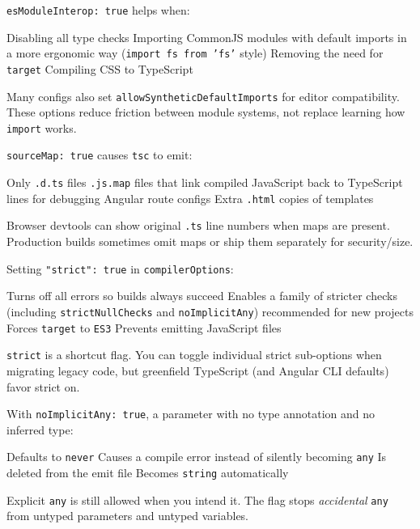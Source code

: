 \question[4]
\texttt{esModuleInterop: true} helps when:
\begin{choices}
  \choice Disabling all type checks
  \CorrectChoice Importing CommonJS modules with default imports in a more ergonomic way (\texttt{import fs from 'fs'} style)
  \choice Removing the need for \texttt{target}
  \choice Compiling CSS to TypeScript
\end{choices}
\begin{solution}
  Many configs also set \texttt{allowSyntheticDefaultImports} for editor compatibility. These options reduce friction between module systems, not replace learning how \texttt{import} works.
\end{solution}

\question[4]
\texttt{sourceMap: true} causes \texttt{tsc} to emit:
\begin{choices}
  \choice Only \texttt{.d.ts} files
  \CorrectChoice \texttt{.js.map} files that link compiled JavaScript back to TypeScript lines for debugging
  \choice Angular route configs
  \choice Extra \texttt{.html} copies of templates
\end{choices}
\begin{solution}
  Browser devtools can show original \texttt{.ts} line numbers when maps are present. Production builds sometimes omit maps or ship them separately for security/size.
\end{solution}

\question[4]
Setting \texttt{"strict": true} in \texttt{compilerOptions}:
\begin{choices}
  \choice Turns off all errors so builds always succeed
  \CorrectChoice Enables a family of stricter checks (including \texttt{strictNullChecks} and \texttt{noImplicitAny}) recommended for new projects
  \choice Forces \texttt{target} to \texttt{ES3}
  \choice Prevents emitting JavaScript files
\end{choices}
\begin{solution}
  \texttt{strict} is a shortcut flag. You can toggle individual strict sub-options when migrating legacy code, but greenfield TypeScript (and Angular CLI defaults) favor strict on.
\end{solution}

\question[4]
With \texttt{noImplicitAny: true}, a parameter with no type annotation and no inferred type:
\begin{choices}
  \choice Defaults to \lstinline[style=tsinline]|never|
  \CorrectChoice Causes a compile error instead of silently becoming \lstinline[style=tsinline]|any|
  \choice Is deleted from the emit file
  \choice Becomes \lstinline[style=tsinline]|string| automatically
\end{choices}
\begin{solution}
  Explicit \lstinline[style=tsinline]|any| is still allowed when you intend it. The flag stops \emph{accidental} \lstinline[style=tsinline]|any| from untyped parameters and untyped variables.
\end{solution}


